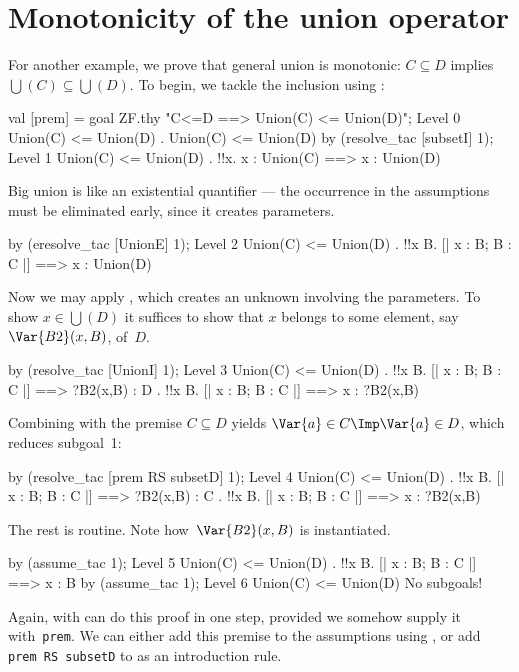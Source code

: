 \section{Monotonicity of the union operator}
For another example, we prove that general union is monotonic:
${C\subseteq D}$ implies $\bigcup(C)\subseteq \bigcup(D)$.  To begin, we
tackle the inclusion using :
\begin{ttbox}
val [prem] = goal ZF.thy "C<=D ==> Union(C) <= Union(D)";
{\out Level 0}
{\out Union(C) <= Union(D)}
{. Union(C) <= Union(D)}
by (resolve_tac [subsetI] 1);
{\out Level 1}
{\out Union(C) <= Union(D)}
{. !!x. x : Union(C) ==> x : Union(D)}
\end{ttbox}
Big union is like an existential quantifier --- the occurrence in the
assumptions must be eliminated early, since it creates parameters.
\begin{ttbox}
by (eresolve_tac [UnionE] 1);
{\out Level 2}
{\out Union(C) <= Union(D)}
{. !!x B. [| x : B; B : C |] ==> x : Union(D)}
\end{ttbox}
Now we may apply , which creates an unknown involving the
parameters.  To show $x\in \bigcup(D)$ it suffices to show that $x$ belongs
to some element, say~$\Var{B2}(x,B)$, of~$D$.
\begin{ttbox}
by (resolve_tac [UnionI] 1);
{\out Level 3}
{\out Union(C) <= Union(D)}
{. !!x B. [| x : B; B : C |] ==> ?B2(x,B) : D}
{. !!x B. [| x : B; B : C |] ==> x : ?B2(x,B)}
\end{ttbox}
Combining  with the premise $C\subseteq D$ yields 
$\Var{a}\in C \Imp \Var{a}\in D$, which reduces subgoal~1:
\begin{ttbox}
by (resolve_tac [prem RS subsetD] 1);
{\out Level 4}
{\out Union(C) <= Union(D)}
{. !!x B. [| x : B; B : C |] ==> ?B2(x,B) : C}
{. !!x B. [| x : B; B : C |] ==> x : ?B2(x,B)}
\end{ttbox}
The rest is routine.  Note how~$\Var{B2}(x,B)$ is instantiated.
\begin{ttbox}
by (assume_tac 1);
{\out Level 5}
{\out Union(C) <= Union(D)}
{. !!x B. [| x : B; B : C |] ==> x : B}
by (assume_tac 1);
{\out Level 6}
{\out Union(C) <= Union(D)}
{\out No subgoals!}
\end{ttbox}
Again,  with  can do this proof in one
step, provided we somehow supply it with~{\tt prem}.  We can either add
this premise to the assumptions using , or add
\hbox{\tt prem RS subsetD} to  as an introduction rule.

